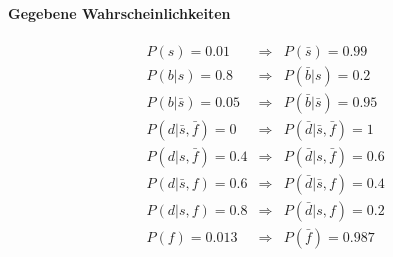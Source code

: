\documentclass[DIV=9,numbers=noenddot]{scrartcl}
\begin{document}
		\paragraph{Gegebene Wahrscheinlichkeiten}
			\begin{align*}
				  &P(s)                 = 0.01  &\Rightarrow &P(\bar{s})                 = 0.99
				\\&P(b|s)               = 0.8   &\Rightarrow &P(\bar{b}|s)               = 0.2
				\\&P(b|\bar{s})         = 0.05  &\Rightarrow &P(\bar{b}|\bar{s})         = 0.95
				\\&P(d|\bar{s},\bar{f}) = 0     &\Rightarrow &P(\bar{d}|\bar{s},\bar{f}) = 1
				\\&P(d|s,\bar{f})       = 0.4   &\Rightarrow &P(\bar{d}|s,\bar{f})       = 0.6
				\\&P(d|\bar{s},f)       = 0.6   &\Rightarrow &P(\bar{d}|\bar{s},f)       = 0.4
				\\&P(d|s,f)             = 0.8   &\Rightarrow &P(\bar{d}|s,f)             = 0.2
				\\&P(f)                 = 0.013 &\Rightarrow &P(\bar{f})                 = 0.987
			\end{align*}
\end{document}
